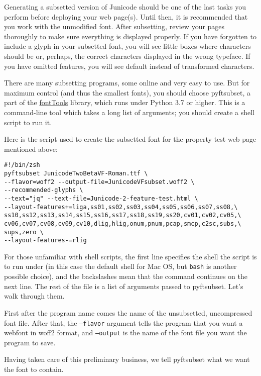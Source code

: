 \documentclass[12pt,letterpaper,openany]{book}
\begin{document}
Generating a subsetted version of Junicode should be one of the last tasks you
perform before deploying your web page(s). Until then, it is recommended that
you work with the unmodified font. After subsetting, review your
pages thoroughly to make sure everything is displayed properly. If you have
forgotten to include a glyph in your subsetted font, you will see little boxes
where characters should be or, perhaps, the correct characters
displayed in the wrong typeface. If you have omitted features, you will see
default instead of transformed characters.

There are many subsetting programs, some online and very easy to use. But for
maximum control (and thus the smallest fonts), you should choose pyftsubset, a
part of the \href{https://github.com/fonttools/fonttools}{fontTools} library,
which runs under Python 3.7 or higher. This is a command-line tool which
takes a long list of arguments; you should create a shell script to run it.

Here is the script used to create the subsetted font for the property test
web page mentioned above:

\small\begin{verbatim}
#!/bin/zsh
pyftsubset JunicodeTwoBetaVF-Roman.ttf \
--flavor=woff2 --output-file=JunicodeVFsubset.woff2 \
--recommended-glyphs \
--text="jq" --text-file=Junicode-2-feature-test.html \
--layout-features+=liga,ss01,ss02,ss03,ss04,ss05,ss06,ss07,ss08,\
ss10,ss12,ss13,ss14,ss15,ss16,ss17,ss18,ss19,ss20,cv01,cv02,cv05,\
cv06,cv07,cv08,cv09,cv10,dlig,hlig,onum,pnum,pcap,smcp,c2sc,subs,\
sups,zero \
--layout-features-=rlig
\end{verbatim}

\normalsize\noindent For those unfamiliar with shell scripts, the first line specifies the shell
the script is to run under (in this case the default shell for Mac OS, but
\texttt{bash} is another possible choice), and the backslashes mean
that the command continues on the next line. The rest of the file is a list
of arguments passed to pyftsubset. Let's walk through them.

First after the program name comes the name of the unsubsetted, uncompressed
font file. After that,
the \texttt{--flavor} argument tells the program that you want a webfont in
woff2 format, and \texttt{--output} is the name of the font file you want the
program to save.

Having taken care of this preliminary business, we tell pyftsubset what we
want the font to contain.
\end{document}
